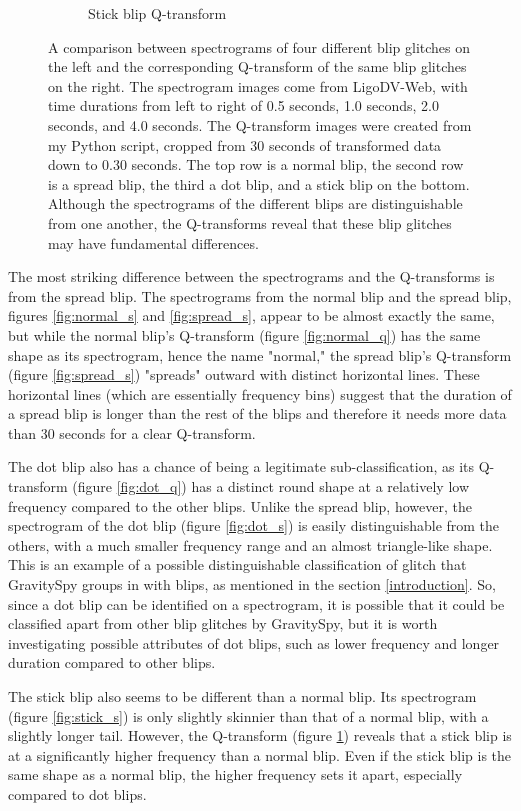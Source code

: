 \documentclass[a4paper]{article}
\begin{document}
\begin{figure}[h!]
\begin{subfigure}[t]{.29\textwidth}
		\caption{Stick blip Q-transform}
		\label{fig:stick_q}
	\end{subfigure}
	\caption{A comparison between spectrograms of four different blip glitches on the left and the corresponding Q-transform of the same blip glitches on the right. The spectrogram images come from LigoDV-Web, with time durations from left to right of 0.5 seconds, 1.0 seconds, 2.0 seconds, and 4.0 seconds. The Q-transform images were created from my Python script, cropped from 30 seconds of transformed data down to 0.30 seconds. The top row is a normal blip, the second row is a spread blip, the third a dot blip, and a stick blip on the bottom. Although the spectrograms of the different blips are distinguishable from one another, the Q-transforms reveal that these blip glitches may have fundamental differences.}
	\label{fig:comparison}
\end{figure}

The most striking difference between the spectrograms and the Q-transforms is from the spread blip. The spectrograms from the normal blip and the spread blip, figures \ref{fig:normal_s} and \ref{fig:spread_s}, appear to be almost exactly the same, but while the normal blip's Q-transform (figure \ref{fig:normal_q}) has the same shape as its spectrogram, hence the name "normal," the spread blip's Q-transform (figure \ref{fig:spread_s}) "spreads" outward with distinct horizontal lines. These horizontal lines (which are essentially frequency bins) suggest that the duration of a spread blip is longer than the rest of the blips and therefore it needs more data than 30 seconds for a clear Q-transform. 

The dot blip also has a chance of being a legitimate sub-classification, as its Q-transform (figure \ref{fig:dot_q}) has a distinct round shape at a relatively low frequency compared to the other blips. Unlike the spread blip, however, the spectrogram of the dot blip (figure \ref{fig:dot_s}) is easily distinguishable from the others, with a much smaller frequency range and an almost triangle-like shape. This is an example of a possible distinguishable classification of glitch that GravitySpy groups in with blips, as mentioned in the section \ref{introduction}. So, since a dot blip can be identified on a spectrogram, it is possible that it could be classified apart from other blip glitches by GravitySpy, but it is worth investigating possible attributes of dot blips, such as lower frequency and longer duration compared to other blips.

The stick blip also seems to be different than a normal blip. Its spectrogram (figure \ref{fig:stick_s}) is only slightly skinnier than that of a normal blip, with a slightly longer tail. However, the Q-transform (figure \ref{fig:stick_q}) reveals that a stick blip is at a significantly higher frequency than a normal blip. Even if the stick blip is the same shape as a normal blip, the higher frequency sets it apart, especially compared to dot blips.
\end{document}

